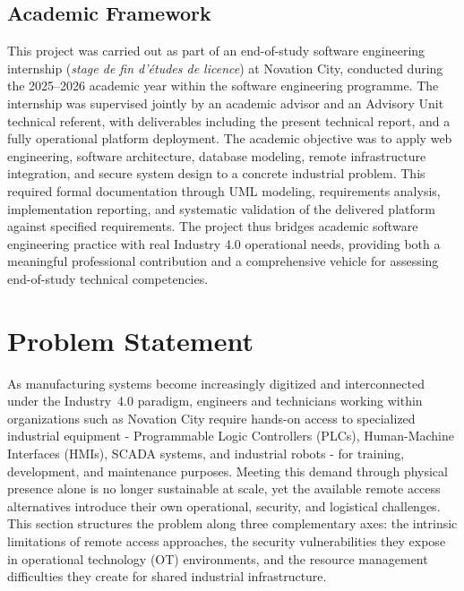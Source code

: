 \subsection{Academic Framework}

This project was carried out as part of an end-of-study software engineering
internship (\textit{stage de fin d'études de licence}) at Novation City, conducted
during the 2025--2026 academic year within the software engineering programme. The
internship was supervised jointly by an academic advisor and an Advisory Unit
technical referent, with deliverables including the present technical report, and a fully operational platform deployment. The academic
objective was to apply web engineering, software architecture, database modeling,
remote infrastructure integration, and secure system design to a concrete industrial
problem. This required formal documentation through UML modeling, requirements
analysis, implementation reporting, and systematic validation of the delivered
platform against specified requirements. The project thus bridges academic software
engineering practice with real Industry 4.0 operational needs, providing both a
meaningful professional contribution and a comprehensive vehicle for assessing
end-of-study technical competencies.

\section{Problem Statement}
\label{sec:problem_statement}

As manufacturing systems become increasingly digitized and interconnected under
the Industry~4.0 paradigm, engineers and technicians working within organizations
such as Novation City require hands-on access to specialized industrial equipment
- Programmable Logic Controllers (PLCs), Human-Machine Interfaces (HMIs), SCADA
systems, and industrial robots - for training, development, and maintenance
purposes. Meeting this demand through physical presence alone is no longer
sustainable at scale, yet the available remote access alternatives introduce
their own operational, security, and logistical challenges. This section
structures the problem along three complementary axes: the intrinsic limitations
of remote access approaches, the security vulnerabilities they expose in
operational technology (OT) environments, and the resource management difficulties
they create for shared industrial infrastructure.


